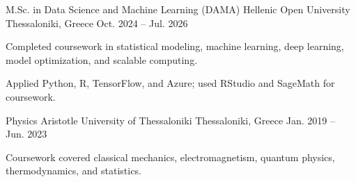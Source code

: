 
\begin{cventries}

  \cventry
    {M.Sc. in Data Science and Machine Learning (DAMA)}
    {Hellenic Open University}
    {Thessaloniki, Greece}
    {Oct. 2024 -- Jul. 2026}
    {
      \begin{cvitems}
        \item {Completed coursework in statistical modeling, machine learning, deep learning, model optimization, and scalable computing.}
        \item {Applied Python, R, TensorFlow, and Azure; used RStudio and SageMath for coursework.}
      \end{cvitems}
    }

  \cventry
    {Physics}
    {Aristotle University of Thessaloniki}
    {Thessaloniki, Greece}
    {Jan. 2019 -- Jun. 2023}
    {
      \begin{cvitems}
        \item {Coursework covered classical mechanics, electromagnetism, quantum physics, thermodynamics, and statistics.}
      \end{cvitems}
    }

\end{cventries}
